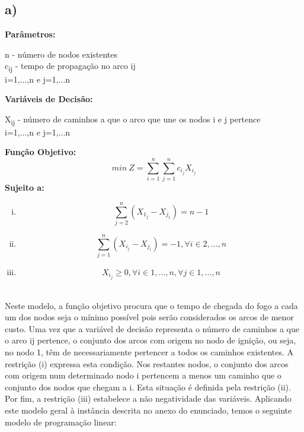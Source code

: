 \documentclass[11pt]{article} %
\begin{document}
\subsection*{a)}
\textbf{Parâmetros:}  \\
\begin{center}
n - número de nodos existentes \\
c\textsubscript{ij} - tempo de propagação no arco ij\\
i=1,...,n e j=1,...n \\
\end{center}
\textbf{Variáveis de Decisão:} \\
\begin{center}
X\textsubscript{ij} - número de caminhos a que o arco que une os nodos i e j pertence\\
i=1,...,n e j=1,...n \\
\end{center}
\textbf{Função Objetivo:} \\
$$min \ Z = \sum_{i=1}^{n} \sum_{j=1}^{n} c_i_jX_i_j$$
\textbf{Sujeito a:}
\begin{enumerate}[(i)]
\item $$\sum_{j=2}^{n} (X_1_j - X_j_1) = n-1$$
\item $$\sum_{j=1}^{n} (X_i_j - X_j_i) = -1, \forall i \in 2,...,n $$
\item $$X_i_j \geq 0, \forall i \in 1,...,n , \forall j \in 1,...,n$$
\end{enumerate}\\


Neste modelo, a função objetivo procura que o tempo de chegada do fogo a cada um dos nodos seja o mínimo possível pois serão considerados os arcos de menor custo. Uma vez que a variável de decisão representa o número de caminhos a que o arco ij pertence, o conjunto dos arcos com origem no nodo de ignição, ou seja, no nodo 1,  têm de necessariamente pertencer a todos os caminhos existentes. A restrição (i) expressa esta condição. Nos restantes nodos, o conjunto dos arcos com origem num determinado nodo i pertencem a menos um caminho que o conjunto dos nodos que chegam a i. Esta situação é definida pela restrição (ii). Por fim, a restrição (iii) estabelece a não negatividade das variáveis.
Aplicando este modelo geral à instância descrita no anexo do enunciado, temos o seguinte modelo de programação linear:

\newpage
\end{document}
